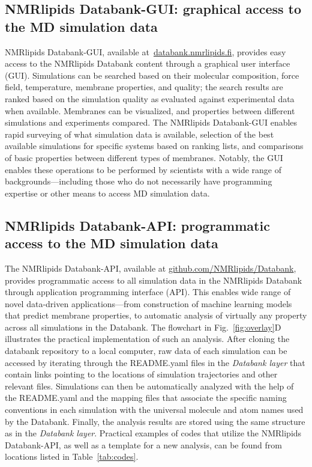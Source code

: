\documentclass[fleqn,10pt]{wlscirep}
\begin{document}
\subsection{NMRlipids Databank-GUI: graphical access to the MD simulation data}
NMRlipids Databank-GUI, available at~\href{https://www.databank.nmrlipids.fi}{databank.nmrlipids.fi}, provides easy access to the NMRlipids Databank content through a graphical user interface (GUI). Simulations can be searched based on their molecular composition, force field, temperature, membrane properties, and quality; the search results are ranked based on the simulation quality as evaluated against experimental data when available. Membranes can be visualized, and properties between different simulations and experiments compared. The NMRlipids Databank-GUI enables rapid surveying of what simulation data is available, selection of the best available simulations for specific systems based on ranking lists, and comparisons of basic properties between different types of membranes. Notably, the GUI enables these operations to be performed by scientists with a wide range of backgrounds---including those who do not necessarily have programming expertise or other means to access MD simulation data. 

\subsection{NMRlipids Databank-API: programmatic access to the MD simulation data}\label{section:access}
The NMRlipids Databank-API, available at \href{https://github.com/NMRlipids/Databank}{github.com/NMRlipids/Databank}, provides programmatic access to all simulation data in the NMRlipids Databank through application programming interface (API). This enables wide range of novel data-driven applications---from construction of machine learning models that predict membrane properties, to automatic analysis of virtually any property across all simulations in the Databank. The flowchart in Fig.~\ref{fig:overlay}D illustrates the practical implementation of such an analysis. After cloning the databank repository to a local computer, raw data of each simulation can be accessed by iterating through the README.yaml files in the {\it Databank layer} that contain links pointing to the locations of simulation trajectories and other relevant files. Simulations can then be automatically analyzed with the help of the README.yaml and the mapping files that associate the specific naming conventions in each simulation with the universal molecule and atom names used by the Databank. Finally, the analysis results are stored using the same structure as in the {\it Databank layer}. Practical examples of codes that utilize the NMRlipids Databank-API, as well as a template for a new analysis, can be found from locations listed in Table~\ref{tab:codes}.
\end{document}
